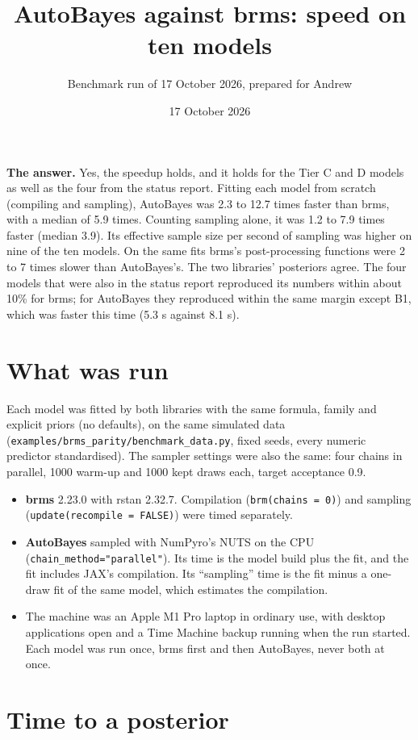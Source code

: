 \documentclass[11pt]{article}
\title{AutoBayes against brms: speed on ten models}
\author{Benchmark run of 17 October 2026, prepared for Andrew}
\date{17 October 2026}
\newcommand{\code}[1]{\texttt{#1}}
\newcommand{\file}[1]{\texttt{#1}}
\begin{document}
\maketitle

\noindent \textbf{The answer.} Yes, the speedup holds, and it holds for the Tier C and D models as well as the four
from the status report. Fitting each model from scratch (compiling and sampling), AutoBayes was 2.3 to 12.7 times faster
than brms, with a median of 5.9 times. Counting sampling alone, it was 1.2 to 7.9 times faster (median 3.9). Its
effective sample size per second of sampling was higher on nine of the ten models. On the same fits brms's
post-processing functions were 2 to 7 times slower than AutoBayes's. The two libraries' posteriors agree. The four
models that were also in the status report reproduced its numbers within about 10\% for brms; for AutoBayes they
reproduced within the same margin except B1, which was faster this time (5.3 s against 8.1 s).

\section{What was run}

Each model was fitted by both libraries with the same formula, family and explicit priors (no defaults), on the same
simulated data (\file{examples/brms\_parity/benchmark\_data.py}, fixed seeds, every numeric predictor standardised).
The sampler settings were also the same: four chains in parallel, 1000 warm-up and 1000 kept draws each, target
acceptance 0.9.
\begin{itemize}
\item \textbf{brms} 2.23.0 with rstan 2.32.7. Compilation (\code{brm(chains = 0)}) and sampling
  (\code{update(recompile = FALSE)}) were timed separately.
\item \textbf{AutoBayes} sampled with NumPyro's NUTS on the CPU (\code{chain\_method="parallel"}). Its time is the
  model build plus the fit, and the fit includes JAX's compilation. Its ``sampling'' time is the fit minus a one-draw
  fit of the same model, which estimates the compilation.
\item The machine was an Apple M1 Pro laptop in ordinary use, with desktop applications open and a Time Machine backup
  running when the run started. Each model was run once, brms first and then AutoBayes, never both at once.
\end{itemize}

\section{Time to a posterior}
\end{document}
